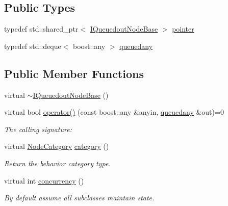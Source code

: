\subsection*{Public Types}
\begin{DoxyCompactItemize}
\item 
typedef std\+::shared\+\_\+ptr$<$ \hyperlink{class_wire_cell_1_1_i_queuedout_node_base}{I\+Queuedout\+Node\+Base} $>$ \hyperlink{class_wire_cell_1_1_i_queuedout_node_base_aa63057649c875c83e25d4078b774b4cb}{pointer}
\item 
typedef std\+::deque$<$ boost\+::any $>$ \hyperlink{class_wire_cell_1_1_i_queuedout_node_base_a9c144f13ef75e051847fe22888977a11}{queuedany}
\end{DoxyCompactItemize}
\subsection*{Public Member Functions}
\begin{DoxyCompactItemize}
\item 
virtual \hyperlink{class_wire_cell_1_1_i_queuedout_node_base_a44f8bacbe74f77b87445765f29b80ec1}{$\sim$\+I\+Queuedout\+Node\+Base} ()
\item 
virtual bool \hyperlink{class_wire_cell_1_1_i_queuedout_node_base_ad3723d92a4594fc9e3d6718fc0de9b1c}{operator()} (const boost\+::any \&anyin, \hyperlink{class_wire_cell_1_1_i_queuedout_node_base_a9c144f13ef75e051847fe22888977a11}{queuedany} \&out)=0
\begin{DoxyCompactList}\small\item\em The calling signature\+: \end{DoxyCompactList}\item 
virtual \hyperlink{class_wire_cell_1_1_i_node_a5546e64cbb70bd3ac787295cac9ac803}{Node\+Category} \hyperlink{class_wire_cell_1_1_i_queuedout_node_base_a45a6b7c8c0af34108868b9b4a0f2a8cf}{category} ()
\begin{DoxyCompactList}\small\item\em Return the behavior category type. \end{DoxyCompactList}\item 
virtual int \hyperlink{class_wire_cell_1_1_i_queuedout_node_base_aac268591658fea147722dccd6cb5e3a2}{concurrency} ()
\begin{DoxyCompactList}\small\item\em By default assume all subclasses maintain state. \end{DoxyCompactList}\end{DoxyCompactItemize}


